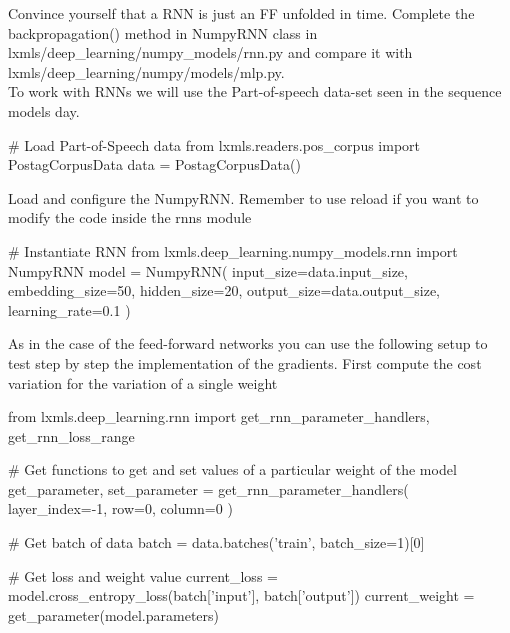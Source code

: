 \begin{exercise}
\label{exercise:rnnnumpy}
Convince yourself that a RNN is just an FF unfolded in time. Complete the 
backpropagation() method in NumpyRNN class in lxmls/deep\_learning/numpy\_models/rnn.py
and compare it with\\ lxmls/deep\_learning/numpy/models/mlp.py.\\

\noindent To work with RNNs we will use the Part-of-speech data-set seen in the
sequence models day.
\begin{python}
# Load Part-of-Speech data 
from lxmls.readers.pos_corpus import PostagCorpusData
data = PostagCorpusData() 
\end{python}
\clearpage
\noindent Load and configure the NumpyRNN. Remember to use reload if you want to modify 
the code inside the rnns module
\begin{python}
# Instantiate RNN
from lxmls.deep_learning.numpy_models.rnn import NumpyRNN
model = NumpyRNN(
    input_size=data.input_size,
    embedding_size=50,
    hidden_size=20,
    output_size=data.output_size,
    learning_rate=0.1
)
\end{python}
As in the case of the feed-forward networks you can use the following setup to
test step by step the implementation of the gradients. First compute the cost
variation for the variation of a single weight
\begin{python}
from lxmls.deep_learning.rnn import get_rnn_parameter_handlers, get_rnn_loss_range

# Get functions to get and set values of a particular weight of the model
get_parameter, set_parameter = get_rnn_parameter_handlers(
    layer_index=-1,
    row=0, 
    column=0
)

# Get batch of data
batch = data.batches('train', batch_size=1)[0]

# Get loss and weight value
current_loss = model.cross_entropy_loss(batch['input'], batch['output'])
current_weight = get_parameter(model.parameters)


\end{python}
\end{exercise}
